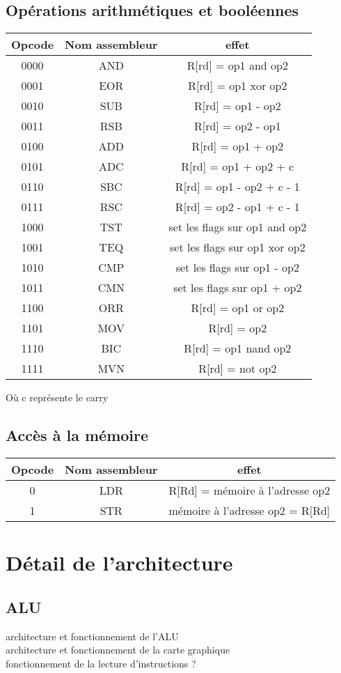 \documentclass[a4paper]{article}
\begin{document}
\subsection{Opérations arithmétiques et booléennes}

\begin{tabular}{|c|c|c|}
  \hline
  Opcode & Nom assembleur & effet \\
  \hline
  0000 & AND & R[rd] = op1 and op2\\
  0001 & EOR & R[rd] = op1 xor op2\\
  0010 & SUB & R[rd] = op1 - op2\\
  0011 & RSB & R[rd] = op2 - op1\\
  0100 & ADD & R[rd] = op1 + op2\\
  0101 & ADC & R[rd] = op1 + op2 + c\\
  0110 & SBC & R[rd] = op1 - op2 + c - 1\\
  0111 & RSC & R[rd] = op2 - op1 + c - 1\\
  1000 & TST & set les flags sur op1 and op2\\
  1001 & TEQ & set les flags sur op1 xor op2\\
  1010 & CMP & set les flags sur op1 - op2\\
  1011 & CMN & set les flags sur op1 + op2\\
  1100 & ORR & R[rd] = op1 or op2\\
  1101 & MOV & R[rd] = op2\\
  1110 & BIC & R[rd] = op1 nand op2\\
  1111 & MVN & R[rd] = not op2\\
  \hline
\end{tabular}

Où c représente le carry

\subsection{Accès à la mémoire}

\begin{tabular}{|c|c|c|}
  \hline
  Opcode & Nom assembleur & effet\\
  \hline
  0 & LDR & R[Rd] = mémoire à l'adresse op2\\
  1 & STR & mémoire à l'adresse op2 = R[Rd]\\
  \hline
            
\end{tabular}

\section{Détail de l'architecture}

\subsection{ALU}



architecture et fonctionnement de l'ALU\\
architecture et fonctionnement de la carte graphique\\
fonctionnement de la lecture d'instructions ?
\end{document}
